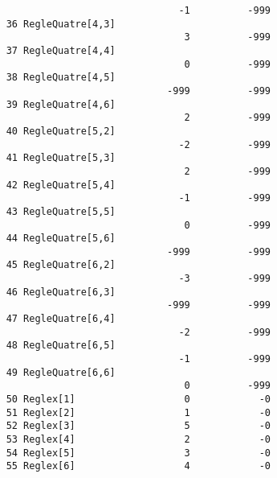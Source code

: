 \begin{lstlisting}
                                  -1          -999
    36 RegleQuatre[4,3]
                                   3          -999
    37 RegleQuatre[4,4]
                                   0          -999
    38 RegleQuatre[4,5]
                                -999          -999
    39 RegleQuatre[4,6]
                                   2          -999
    40 RegleQuatre[5,2]
                                  -2          -999
    41 RegleQuatre[5,3]
                                   2          -999
    42 RegleQuatre[5,4]
                                  -1          -999
    43 RegleQuatre[5,5]
                                   0          -999
    44 RegleQuatre[5,6]
                                -999          -999
    45 RegleQuatre[6,2]
                                  -3          -999
    46 RegleQuatre[6,3]
                                -999          -999
    47 RegleQuatre[6,4]
                                  -2          -999
    48 RegleQuatre[6,5]
                                  -1          -999
    49 RegleQuatre[6,6]
                                   0          -999
    50 Reglex[1]                   0            -0
    51 Reglex[2]                   1            -0
    52 Reglex[3]                   5            -0
    53 Reglex[4]                   2            -0
    54 Reglex[5]                   3            -0
    55 Reglex[6]                   4            -0


\end{lstlisting}
